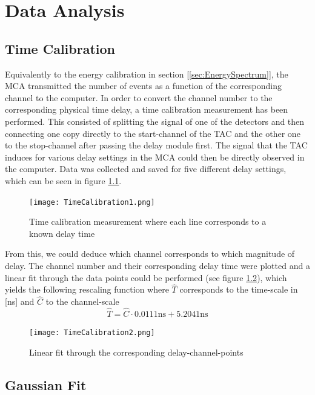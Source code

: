 \documentclass[a4paper,parskip,11pt, DIV12]{scrreprt}
\begin{document}
\chapter{Data Analysis}

\section{Time Calibration} \label{sec:TimeCal}

		Equivalently to the energy calibration in section [\ref{sec:EnergySpectrum}], the MCA transmitted the number of events as a function of the corresponding channel to the computer. In order to convert the channel number to the corresponding physical time delay, a time calibration measurement has been performed. This consisted of splitting the signal of one of the detectors and then connecting one copy directly to the start-channel of the TAC and the other one to the stop-channel after passing the delay module first. The signal that the TAC induces for various delay settings in the MCA could then be directly observed in the computer. Data was collected and saved for five different delay settings, which can be seen in figure \ref{fig:TimeCal1}.
		\begin{figure}[H]
\centering
\texttt{[image: TimeCalibration1.png]}
\caption[TimeCalibration1]{Time calibration measurement where each line corresponds to a known delay time}
\label{fig:TimeCal1}
	\end{figure}
	From this, we could deduce which channel corresponds to which magnitude of delay. The channel number and their corresponding delay time were plotted and a linear fit through the data points could be performed (see figure \ref{fig:TimeCal2}), which yields the following rescaling function where $\hat{T}$ corresponds to the time-scale in [ns] and $\hat{C}$ to the channel-scale
	\begin{equation}
	\hat{T} = \hat{C} \cdot 0.0111 \mathrm{ns} + 5.2041 \mathrm{ns} 
	\end{equation}
	\begin{figure}[H]
\centering
\texttt{[image: TimeCalibration2.png]}
\caption[TimeCalibration2]{Linear fit through the corresponding delay-channel-points}
\label{fig:TimeCal2}
	\end{figure}

\section{Gaussian Fit}
\end{document}
